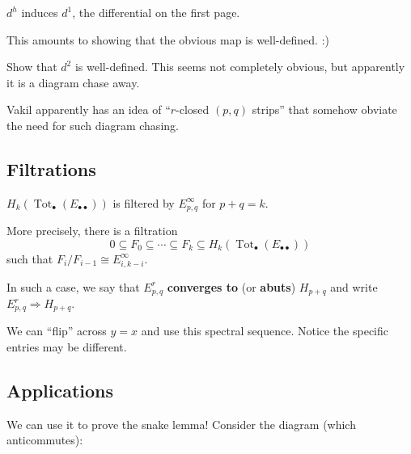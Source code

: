 \documentclass[12pt]{article}
\begin{document}
\begin{prop}
	$d^h$ induces $d^1$, the differential on the first page.
\end{prop}
\begin{prf}
	This amounts to showing that the obvious map is well-defined. :)
\end{prf}
\begin{prob}
	Show that $d^2$ is well-defined. This seems not completely obvious, but apparently it is a diagram chase away.
\end{prob}
\begin{rmk}
	Vakil apparently has an idea of ``$r$-closed $(p,q)$ strips'' that somehow obviate the need for such diagram chasing.
\end{rmk}

\subsection{Filtrations}
\begin{thm}
	$H_k(\operatorname{Tot}_\bullet(E_{\bullet\bullet}))$ is filtered by $E_{p,q}^\infty$ for $p+q=k$. 

	More precisely, there is a filtration 
	\[0\subseteq F_0\subseteq \cdots\subseteq F_k\subseteq H_k(\operatorname{Tot}_\bullet(E_{\bullet\bullet}))\]
	such that $F_i/F_{i-1}\cong E_{i,k-i}^\infty$.
\end{thm}
\begin{rmk}
	In such a case, we say that $E_{p,q}^r$ \textbf{converges to} (or \textbf{abuts}) $H_{p+q}$ and write $E_{p,q}^r\Rightarrow H_{p+q}$.
\end{rmk}
\begin{rmk}
	We can ``flip'' across $y=x$ and use this spectral sequence. Notice the specific entries may be different.
\end{rmk}

\subsection{Applications}
We can use it to prove the snake lemma! Consider the diagram (which anticommutes):
\begin{center}
\end{center}
\end{document}
